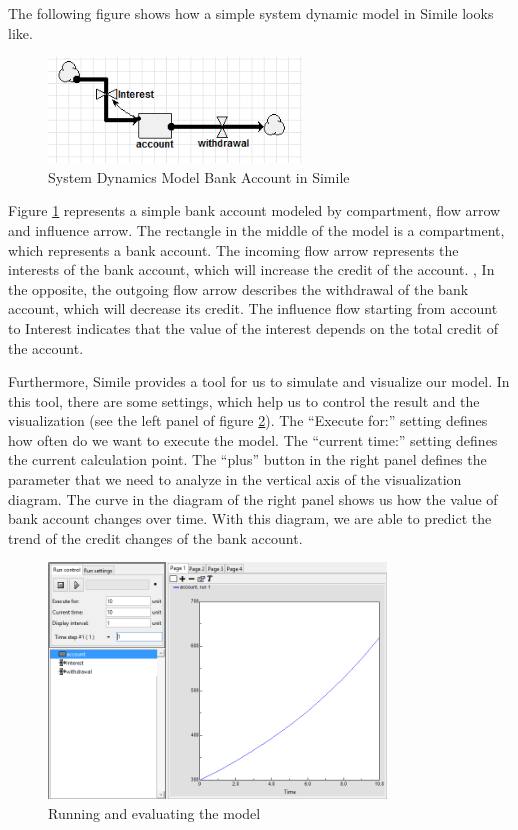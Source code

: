 \par
The following figure shows how a simple system dynamic model in Simile looks like.
\begin{figure}[h]
	\centering
	\includegraphics[width=0.6\textwidth]{pics/simile/simile_example_bank_account.png}
	\caption{System Dynamics Model Bank Account in Simile \label{fig:simile_example_bank}}	
\end{figure}
\par
Figure \ref{fig:simile_example_bank} represents a simple bank account modeled by compartment, flow arrow and influence arrow. The rectangle in the middle of the model is a compartment, which represents a bank account. The incoming flow arrow represents the interests of the bank account, which will increase the credit of the account. , In the opposite, the outgoing flow arrow describes the withdrawal of the bank account, which will decrease its credit. The influence flow starting from account to Interest indicates that the value of the interest depends on the total credit of the account.
\par
Furthermore, Simile provides a tool for us to simulate and visualize our model. In this tool, there are some settings, which help us to control the result and the visualization (see the left panel of figure \ref{fig:simile_example_evaluating}). The ``Execute for:'' setting defines how often do we want to execute the model. The ``current time:'' setting defines the current calculation point. The ``plus'' button in the right panel defines the parameter that we need to analyze in the vertical axis of the visualization diagram. The curve in the diagram of the right panel shows us how the value of bank account changes over time. With this diagram, we are able to predict the trend of the credit changes of the bank account.
\begin{figure}[h]
	\centering
	\includegraphics[width=0.8\textwidth]{pics/simile/simile_example_evaluating_model.png}
	\caption{Running and evaluating the model \label{fig:simile_example_evaluating}}	
\end{figure}
